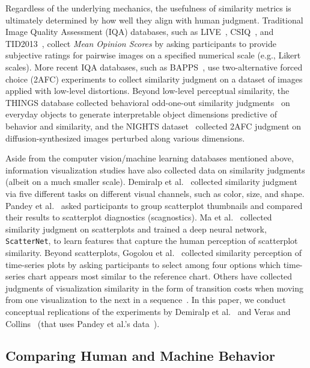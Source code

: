 \documentclass[sigconf]{acmart}
\begin{document}
Regardless of the underlying mechanics, the usefulness of similarity metrics is ultimately determined by how well they align with human judgment. Traditional Image Quality Assessment (IQA) databases, such as LIVE~\cite{sheikh2003image}, CSIQ~\cite{larson2010most}, and TID2013~\cite{ponomarenko2015image}, collect \textit{Mean Opinion Scores} by asking participants to provide subjective ratings for pairwise images on a specified numerical scale (e.g., Likert scales).  More recent IQA databases, such as BAPPS~\cite{zhangUnreasonableEffectivenessDeep2018}, use two-alternative forced choice (2AFC) experiments to collect similarity judgment on a dataset of images applied with low-level distortions. Beyond low-level perceptual similarity, the THINGS database collected behavioral odd-one-out similarity judgments~\cite{hebart2019things, hebart2020revealing} on everyday objects to generate interpretable object dimensions predictive of behavior and similarity, and the NIGHTS dataset~\cite{fu2023dreamsim} collected 2AFC judgment on diffusion-synthesized images perturbed along various dimensions. 

Aside from the computer vision/machine learning databases mentioned above, information visualization studies have also collected data on similarity judgments (albeit on a much smaller scale). Demiralp et al.~\cite{demiralp2014learning} collected similarity judgment via five different tasks on different visual channels, such as color, size, and shape. Pandey et al.~\cite{pandey2016towards} asked participants to group scatterplot thumbnails and compared their results to scatterplot diagnostics (scagnostics). Ma et al.~\cite{ma2018scatternet} collected similarity judgment on scatterplots and trained a deep neural network, \texttt{ScatterNet}, to learn features that capture the human perception of scatterplot similarity. Beyond scatterplots, Gogolou et al.~\cite{gogolou2018comparing} collected similarity perception of time-series plots by asking participants to select among four options which time-series chart appears most similar to the reference chart. 
Others have collected judgments of visualization similarity in the form of transition costs when moving from one visualization to the next in a sequence~\cite{hullman2013deeper,kim2017graphscape}. In this paper, we conduct conceptual replications of the experiments by Demiralp et al.~\cite{demiralp2014learning} and Veras and Collins~\cite{veras2019discriminability} (that uses Pandey et al.'s data~\cite{pandey2016towards}). 

\subsection{Comparing Human and Machine Behavior} 
\end{document}
